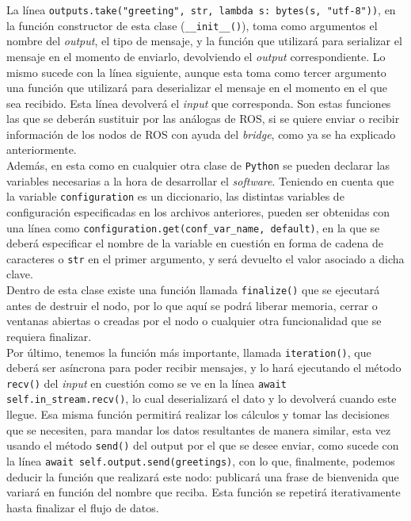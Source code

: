 La línea \verb|outputs.take("greeting", str, lambda s: bytes(s, "utf-8"))|, en
la función constructor de esta clase (\verb|__init__()|), toma como argumentos
el nombre del \textit{output}, el tipo de mensaje, y la función que utilizará
para serializar el mensaje en el momento de enviarlo, devolviendo el
\textit{output} correspondiente.
Lo mismo sucede con la línea siguiente, aunque esta toma como tercer argumento
una función que utilizará para deserializar el mensaje en el momento en el que
sea recibido.
Esta línea devolverá el \textit{input} que corresponda.
Son estas funciones las que se deberán sustituir por las análogas de ROS, si se
quiere enviar o recibir información de los nodos de ROS con ayuda del
\textit{bridge}, como ya se ha explicado anteriormente.
\\

Además, en esta como en cualquier otra clase de \texttt{Python} se pueden
declarar las variables necesarias a la hora de desarrollar el \textit{software}.
Teniendo en cuenta que la variable \verb|configuration| es un diccionario, las
distintas variables de configuración especificadas en los archivos anteriores,
pueden ser obtenidas con una línea como
\verb|configuration.get(conf_var_name, default)|, en la que se deberá
especificar el nombre de la variable en cuestión en forma de cadena de
caracteres o \texttt{str} en el primer argumento, y será devuelto el valor
asociado a dicha clave.
\\

Dentro de esta clase existe una función llamada \verb|finalize()| que se
ejecutará antes de destruir el nodo, por lo que aquí se podrá liberar memoria,
cerrar o ventanas abiertas o creadas por el nodo o cualquier otra funcionalidad
que se requiera finalizar.
\\

Por último, tenemos la función más importante, llamada \verb|iteration()|, que
deberá ser asíncrona para poder recibir mensajes, y lo hará ejecutando el método
\verb|recv()| del \textit{input} en cuestión como se ve en la línea
\verb|await self.in_stream.recv()|, lo cual deserializará el dato y lo devolverá
cuando este llegue.
Esa misma función permitirá realizar los cálculos y tomar las decisiones que se
necesiten, para mandar los datos resultantes de manera similar, esta vez usando
el método \verb|send()| del output por el que se desee enviar, como sucede con
la línea \verb|await self.output.send(greetings)|, con lo que, finalmente,
podemos deducir la función que realizará este nodo: publicará una frase de
bienvenida que variará en función del nombre que reciba.
Esta función se repetirá iterativamente hasta finalizar el flujo de datos.
\\



